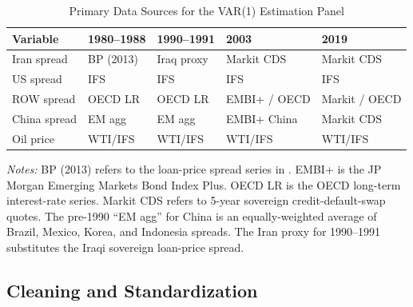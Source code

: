 \documentclass[12pt,a4paper]{article}
\begin{document}
\begin{table}[htbp]
\centering
\caption{Primary Data Sources for the VAR(1) Estimation Panel}
\label{tab:data_sources}
\begin{threeparttable}
\begin{tabular}{lllll}
\toprule
Variable & 1980--1988 & 1990--1991 & 2003 & 2019 \\
\midrule
Iran spread & BP (2013) & Iraq proxy & Markit CDS & Markit CDS \\
US spread & IFS & IFS & IFS & IFS \\
ROW spread & OECD LR & OECD LR & EMBI+ / OECD & Markit / OECD \\
China spread & EM agg & EM agg & EMBI+ China & Markit CDS \\
Oil price & WTI/IFS & WTI/IFS & WTI/IFS & WTI/IFS \\
\bottomrule
\end{tabular}
\begin{tablenotes}
\small
\item \textit{Notes:} BP (2013) refers to the loan-price spread series in \citet{borensztein2013debt}. EMBI+ is the JP Morgan Emerging Markets Bond Index Plus. OECD LR is the OECD long-term interest-rate series. Markit CDS refers to 5-year sovereign credit-default-swap quotes. The pre-1990 ``EM agg'' for China is an equally-weighted average of Brazil, Mexico, Korea, and Indonesia spreads. The Iran proxy for 1990--1991 substitutes the Iraqi sovereign loan-price spread.
\end{tablenotes}
\end{threeparttable}
\end{table}

\subsection{Cleaning and Standardization}
\end{document}
